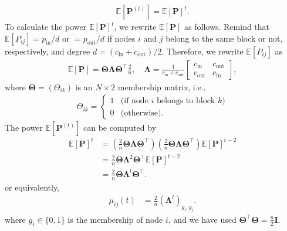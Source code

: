 \documentclass[12pt]{article} %
\def\mat#1{\mathbf{#1}}
\def\Exp{{\mathbb E}}
\def\ie{i.e.,~}
\begin{document}
\begin{align}
    \Exp\left[ \mat{P}^{(t)} \right]  = \Exp\left[ \mat{P} \right] ^t.
\end{align}
To calculate the power $\Exp\left[ \mat{P} \right] ^t$, we rewrite $\Exp\left[ \mat{P} \right]$ as follows.
Remind that $\Exp\left[ P_{ij} \right] = p_\text{in}/d$ or $= p_\text{out}/d$ if nodes $i$ and $j$ belong
to the same block or not, respectively, and
degree $d = (c_{\text{in}} + c_{\text{out}})/2$.
Therefore, we rewrite $\Exp\left[ P_{ij} \right]$ as
\begin{align}
    \Exp\left[ \mat{P} \right] = \mat{\Theta} \mat{\Lambda}\mat{\Theta}^\top  \frac{2}{n},\quad
    \mat{\Lambda} =
    \frac{1}{c_{\text{in}} + c_{\text{out}}}\left[
        \begin{array}{cc}
            c_{\text{in}}  &
            c_{\text{out}}   \\
            c_{\text{out}} &
            c_{\text{in}}
        \end{array}
        \right],
\end{align}
where $\mat{\Theta} = (\Theta_{ik})$ is an $N\times 2$ membership matrix, \ie
\begin{align}
    \Theta_{ik} = \left\{
    \begin{array}{cl}
        1 & \text{(if node $i$ belongs to block $k$)} \\
        0 & \text{(otherwise)}.
    \end{array}
    \right.
\end{align}
The power $\Exp\left[ \mat{P}^{(t)} \right]$ can be computed by
\begin{align}
    \Exp\left[ \mat{P} \right] ^t & =
    \left( \frac{2}{n}\mat{\Theta} \mat{\Lambda} \mat{\Theta}^\top\right) \left(\frac{2}{n}\mat{\Theta} \mat{\Lambda} \mat{\Theta}^\top \right)\Exp\left[ \mat{P} \right] ^{t-2} \nonumber \\
                                  & = \frac{2}{n}\mat{\Theta} \mat{\Lambda}^2 \mat{\Theta}^\top \Exp\left[ \mat{P} \right] ^{t-2} \nonumber                                                \\
                                  & = \frac{2}{n}\mat{\Theta} \mat{\Lambda}^t \mat{\Theta}^\top.
\end{align}
or equivalently,
\begin{align}
    \mu_{ij}(t)
     & = \frac{2}{n}\left(\mat{\Lambda}^t \right)_{g_i, g_j}.
\end{align}
where $g_i \in \{0, 1\}$ is the membership of node $i$, and we have used $\mat{\Theta}^\top \mat{\Theta} = \frac{n}{2}\mat{I}$.
\end{document}
